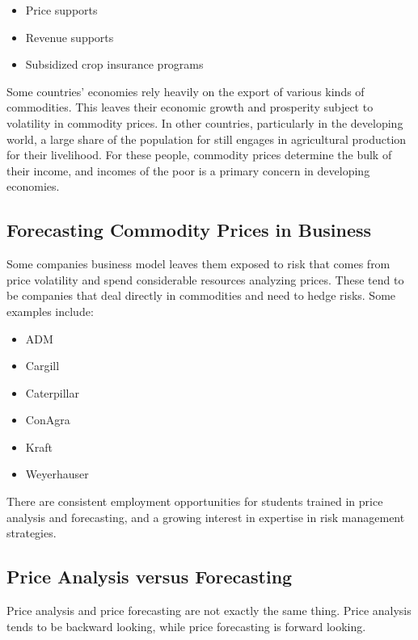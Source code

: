 \documentclass[
  letterpaper,
  DIV=11,
  numbers=noendperiod]{scrreprt}
\providecommand{\tightlist}{%
  \setlength{\itemsep}{0pt}\setlength{\parskip}{0pt}}\usepackage{longtable,booktabs,array}
\begin{document}
\begin{itemize}
\tightlist
\item
  Price supports
\item
  Revenue supports
\item
  Subsidized crop insurance programs
\end{itemize}

Some countries' economies rely heavily on the export of various kinds of
commodities. This leaves their economic growth and prosperity subject to
volatility in commodity prices. In other countries, particularly in the
developing world, a large share of the population for still engages in
agricultural production for their livelihood. For these people,
commodity prices determine the bulk of their income, and incomes of the
poor is a primary concern in developing economies.

\hypertarget{forecasting-commodity-prices-in-business}{%
\subsection{Forecasting Commodity Prices in
Business}\label{forecasting-commodity-prices-in-business}}

Some companies business model leaves them exposed to risk that comes
from price volatility and spend considerable resources analyzing prices.
These tend to be companies that deal directly in commodities and need to
hedge risks. Some examples include:

\begin{itemize}
\tightlist
\item
  ADM
\item
  Cargill
\item
  Caterpillar
\item
  ConAgra
\item
  Kraft
\item
  Weyerhauser
\end{itemize}

There are consistent employment opportunities for students trained in
price analysis and forecasting, and a growing interest in expertise in
risk management strategies.

\hypertarget{price-analysis-versus-forecasting}{%
\subsection{Price Analysis versus
Forecasting}\label{price-analysis-versus-forecasting}}

Price analysis and price forecasting are not exactly the same thing.
Price analysis tends to be backward looking, while price forecasting is
forward looking.
\end{document}
